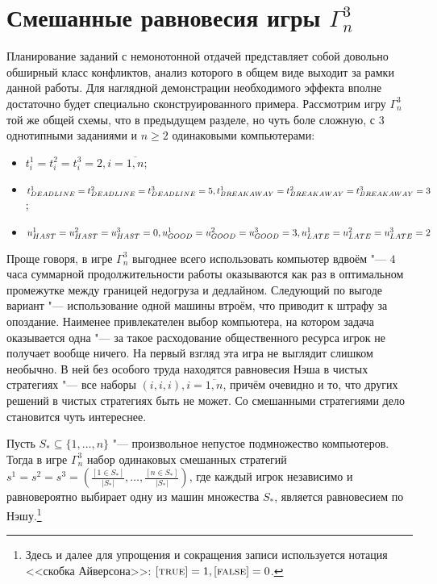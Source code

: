 \section{Смешанные равновесия игры $\Gamma^3_n$}\label{sec:ch2/sec3}

Планирование заданий с немонотонной отдачей представляет собой довольно обширный класс конфликтов, анализ которого в общем виде выходит за рамки данной работы. Для наглядной демонстрации необходимого эффекта вполне достаточно будет специально сконструированного примера.  Рассмотрим игру $\Gamma^3_n$ той же общей схемы, что в предыдущем разделе, но чуть боле сложную, с $3$ однотипными заданиями и $n \ge 2$ одинаковыми компьютерами:
\begin{itemize}
	\item $t_i^1 = t_i^2 = t_i^3 = 2, i = \overline{1,n}$;
	\item $t^1_{DEADLINE} = t^2_{DEADLINE} = t^3_{DEADLINE} = 5,\\ t^1_{BREAKAWAY} = t^2_{BREAKAWAY} = t^3_{BREAKAWAY} = 3$;
	\item $u^1_{HAST} = u^2_{HAST} = u^3_{HAST} = 0,\\ u^1_{GOOD} = u^2_{GOOD} = u^3_{GOOD} = 3,\\ u^1_{LATE} = u^2_{LATE} = u^3_{LATE} = 2$
\end{itemize}

Проще говоря, в игре $\Gamma^3_n$ выгоднее всего использовать компьютер вдвоём "--- $4$ часа суммарной продолжительности работы оказываются как раз в оптимальном промежутке между границей недогруза и дедлайном. Следующий по выгоде вариант "--- использование одной машины втроём, что приводит к штрафу за опоздание. Наименее привлекателен выбор компьютера, на котором задача оказывается одна "--- за такое расходование общественного ресурса игрок не получает вообще ничего. На первый взгляд эта игра не выглядит слишком необычно. В ней без особого труда находятся равновесия Нэша в чистых стратегиях "--- все наборы $(i, i, i), i = \overline{1,n}$, причём очевидно и то, что других решений в чистых стратегиях быть не может. Со смешанными стратегиями дело становится чуть интереснее.

\begin{lemma}
	Пусть $S_* \subseteq \{1, \ldots, n\}$ "--- произвольное непустое подмножество компьютеров. Тогда в игре $\Gamma^3_n$ набор одинаковых смешанных стратегий $s^1 = s^2 = s^3 = \left(\frac{[1 \in S_*]}{\left| S_* \right|}, \ldots, \frac{[n \in S_*]}{\left| S_* \right|}\right)$, где каждый игрок независимо и равновероятно выбирает одну из машин множества $S_*$, является равновесием по Нэшу.\footnote{Здесь и далее для упрощения и сокращения записи используется нотация <<скобка Айверсона>>: $[\textsc{true}] = 1, [\textsc{false}] = 0$.}
\end{lemma}


